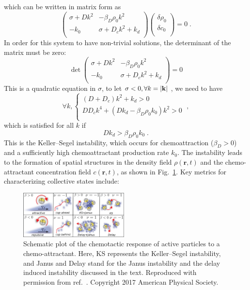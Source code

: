 \documentclass[a4paper, amsfonts, amssymb, amsmath, reprint, showkeys, showpacs, nofootinbib, twoside]{revtex4-2}
\begin{document}
which can be written in matrix form as
\begin{equation}
    \left( \begin{array}{cc}
        \sigma +Dk^2 & -\beta _D\rho _0k^2\\
        -k_0 & \sigma +D_ck^2+k_d\\
    \end{array} \right) \left( \begin{array}{c}
        \delta \rho _0\\
        \delta c_0\\
    \end{array} \right) =0\;.
\end{equation}
In order for this system to have non-trivial solutions, the determinant of the matrix must be zero:
\begin{equation}
    \det \left( \begin{matrix}
        \sigma +Dk^2&		-\beta _D\rho _0k^2\\
        -k_0&		\sigma +D_ck^2+k_d\\
    \end{matrix} \right) =0
\end{equation}
This is a quadratic equation in $\sigma$, to let $\sigma < 0, \forall k=\left|\bf{k}\right|$ , we need to have
\begin{equation}
    \forall k, \begin{cases}
        \left( D+D_c \right) k^2+k_d>0\\
        DD_ck^4+\left( Dk_d-\beta _D\rho _0k_0 \right) k^2>0\\
    \end{cases} \;,
\end{equation}
which is satisfied for all $k$ if
\begin{equation}
    Dk_d>\beta _D\rho _0k_0\;.
\end{equation}
This is the Keller--Segel instability, which occurs for chemoattraction ($\beta_D>0$) and a sufficiently high chemoattractant production rate $k_0$. The instability leads to the formation of spatial structures in the density field $\rho(\mathbf{r},t)$ and the chemo-attractant concentration field $c(\mathbf{r},t)$, as shown in Fig.~\ref{fig:schematicPlot1}. Key metrics for characterizing collective states include:

\begin{figure}
    \includegraphics[width=0.49\textwidth]{./figs/schematicPlot1.png}
    \caption{
        \label{fig:schematicPlot1} Schematic plot of the chemotactic response of active particles to a chemo-attractant. Here, KS represents the Keller--Segel instability, and Janus and Delay stand for the Janus instability and the delay induced instability discussed in the text. Reproduced with permission from ref.~\cite{PhysRevLett.118.268001}. Copyright 2017 American Physical Society.
    }
\end{figure}
\end{document}
